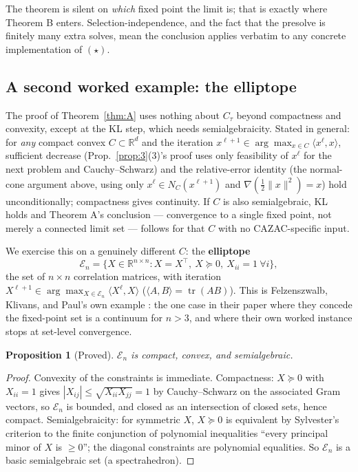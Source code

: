 \documentclass[11pt]{article}
\theoremstyle{plain}
\newtheorem{proposition}[theorem]{Proposition}
\theoremstyle{definition}
\theoremstyle{remark}
\newcommand{\R}{\mathbb R}
\newcommand{\El}{\mathcal E_n}
\begin{document}
The theorem is silent on \emph{which} fixed point the limit is; that is
exactly where Theorem B enters. Selection-independence, and the fact that
the presolve is finitely many extra solves, mean the conclusion applies
verbatim to any concrete implementation of $(\star)$.

\subsection{A second worked example: the elliptope}\label{sec:elliptope}

The proof of Theorem~\ref{thm:A} uses nothing about $C_\tau$ beyond
compactness and convexity, except at the KL step, which needs
semialgebraicity. Stated in general: for \emph{any} compact convex
$C\subset\R^d$ and the iteration
$x^{\ell+1}\in\arg\max_{x\in C}\langle x^\ell,x\rangle$, sufficient decrease
(Prop.~\ref{prop:3}(3)'s proof uses only feasibility of $x^\ell$ for the
next problem and Cauchy--Schwarz) and the relative-error identity (the
normal-cone argument above, using only $x^\ell\in N_C(x^{\ell+1})$ and
$\nabla(\tfrac12\|x\|^2)=x$) hold unconditionally; compactness gives
continuity. If $C$ is also semialgebraic, KL holds \cite{BDLS07} and
Theorem A's conclusion --- convergence to a single fixed point, not merely a
connected limit set --- follows for that $C$ with no CAZAC-specific input.

We exercise this on a genuinely different $C$: the \textbf{elliptope}
$$\El=\{X\in\R^{n\times n}: X=X^\top,\ X\succeq0,\ X_{ii}=1\ \forall i\},$$
the set of $n\times n$ correlation matrices, with iteration
$X^{\ell+1}\in\arg\max_{X\in\El}\langle X^\ell,X\rangle$
($\langle A,B\rangle=\operatorname{tr}(AB)$). This is Felzenszwalb, Klivans,
and Paul's own example \cite{FKP21}: the one case in their paper where they
concede the fixed-point set is a continuum for $n>3$, and where their own
worked instance stops at set-level convergence.

\begin{proposition}[Proved]\label{prop:ell1}
$\El$ is compact, convex, and semialgebraic.
\end{proposition}
\begin{proof}
Convexity of the constraints is immediate. Compactness: $X\succeq0$ with
$X_{ii}=1$ gives $|X_{ij}|\le\sqrt{X_{ii}X_{jj}}=1$ by Cauchy--Schwarz on
the associated Gram vectors, so $\El$ is bounded, and closed as an
intersection of closed sets, hence compact. Semialgebraicity: for
symmetric $X$, $X\succeq0$ is equivalent by Sylvester's criterion to the
finite conjunction of polynomial inequalities ``every principal minor of
$X$ is $\ge0$''; the diagonal constraints are polynomial equalities. So
$\El$ is a basic semialgebraic set (a spectrahedron).
\end{proof}
\end{document}
